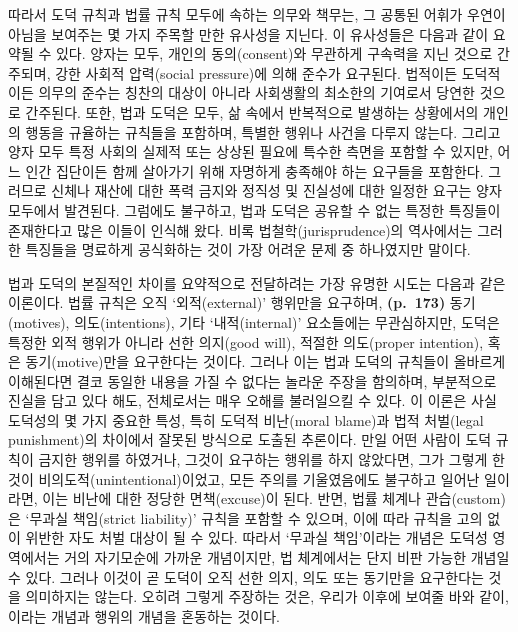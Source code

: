 따라서 도덕 규칙과 법률 규칙 모두에 속하는 의무와 책무는, 그 공통된
어휘가 우연이 아님을 보여주는 몇 가지 주목할 만한 유사성을 지닌다. 이
유사성들은 다음과 같이 요약될 수 있다. 양자는 모두, 개인의
동의(consent)와 무관하게 구속력을 지닌 것으로 간주되며, 강한 사회적
압력(social pressure)에 의해 준수가 요구된다. 법적이든 도덕적이든 의무의
준수는 칭찬의 대상이 아니라 사회생활의 최소한의 기여로서 당연한 것으로
간주된다. 또한, 법과 도덕은 모두, 삶 속에서 반복적으로 발생하는
상황에서의 개인의 행동을 규율하는 규칙들을 포함하며, 특별한 행위나
사건을 다루지 않는다. 그리고 양자 모두 특정 사회의 실제적 또는 상상된
필요에 특수한 측면을 포함할 수 있지만, 어느 인간 집단이든 함께 살아가기
위해 자명하게 충족해야 하는 요구들을 포함한다. 그러므로 신체나 재산에
대한 폭력 금지와 정직성 및 진실성에 대한 일정한 요구는 양자 모두에서
발견된다. 그럼에도 불구하고, 법과 도덕은 공유할 수 없는 특정한 특징들이
존재한다고 많은 이들이 인식해 왔다. 비록 법철학(jurisprudence)의
역사에서는 그러한 특징들을 명료하게 공식화하는 것이 가장 어려운 문제 중
하나였지만 말이다.

법과 도덕의 본질적인 차이를 요약적으로 전달하려는 가장 유명한 시도는
다음과 같은 이론이다. 법률 규칙은 오직 `외적(external)' 행위만을
요구하며, \textbf{(p.~173)} 동기(motives), 의도(intentions), 기타
`내적(internal)' 요소들에는 무관심하지만, 도덕은 특정한 외적 행위가
아니라 선한 의지(good will), 적절한 의도(proper intention), 혹은
동기(motive)만을 요구한다는 것이다. 그러나 이는 법과 도덕의 규칙들이
올바르게 이해된다면 결코 동일한 내용을 가질 수 없다는 놀라운 주장을
함의하며, 부분적으로 진실을 담고 있다 해도, 전체로서는 매우 오해를
불러일으킬 수 있다. 이 이론은 사실 도덕성의 몇 가지 중요한 특성, 특히
도덕적 비난(moral blame)과 법적 처벌(legal punishment)의 차이에서 잘못된
방식으로 도출된 추론이다. 만일 어떤 사람이 도덕 규칙이 금지한 행위를
하였거나, 그것이 요구하는 행위를 하지 않았다면, 그가 그렇게 한 것이
비의도적(unintentional)이었고, 모든 주의를 기울였음에도 불구하고 일어난
일이라면, 이는  비난에 대한 정당한 면책(excuse)이
된다. 반면, 법률 체계나 관습(custom)은 `무과실 책임(strict liability)'
규칙을 포함할 수 있으며, 이에 따라 규칙을 고의 없이 위반한 자도 처벌
대상이 될 수 있다. 따라서 `무과실 책임'이라는 개념은 도덕성 영역에서는
거의 자기모순에 가까운 개념이지만, 법 체계에서는 단지 비판 가능한 개념일
수 있다. 그러나 이것이 곧 도덕이 오직 선한 의지, 의도 또는 동기만을
요구한다는 것을 의미하지는 않는다. 오히려 그렇게 주장하는 것은, 우리가
이후에 보여줄 바와 같이, 이라는 개념과 행위의
 개념을 혼동하는 것이다.

